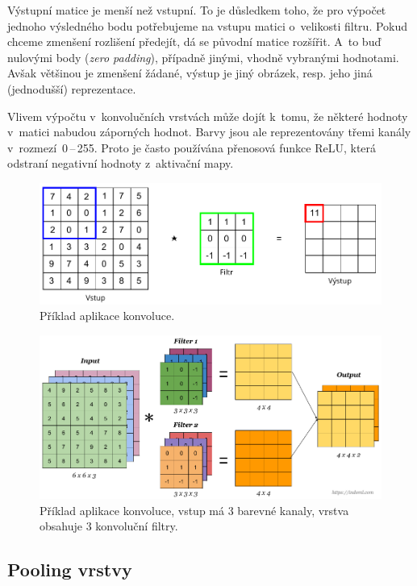 \begin{compactitem}
    \item Výstupní matice je menší než vstupní. To je důsledkem toho, že pro výpočet jednoho výsledného bodu potřebujeme na vstupu matici o~velikosti filtru. Pokud chceme zmenšení rozlišení předejít, dá se původní matice rozšířit. A~to buď nulovými body (\textit{zero padding}), případně jinými, vhodně vybranými hodnotami. Avšak většinou je zmenšení žádané, výstup je jiný obrázek, resp. jeho jiná (jednodušší) reprezentace.

    \item Vlivem výpočtu v~konvolučních vrstvách může dojít k~tomu, že některé hodnoty v~matici nabudou záporných hodnot. Barvy jsou ale reprezentovány třemi kanály v~rozmezí~0\,--\,255. Proto je často používána přenosová funkce ReLU, která odstraní negativní hodnoty z~aktivační mapy.
\end{compactitem}

\begin{figure}[H]
    \centering
    \includegraphics[width=0.8\linewidth]{convolution.pdf}
    \caption{Příklad aplikace konvoluce.}
\end{figure}

\begin{figure}[H]
    \centering
    \includegraphics[width=1\linewidth]{conv.png}
    \caption{Příklad aplikace konvoluce, vstup má 3 barevné kanaly, vrstva obsahuje 3 konvoluční filtry.}
\end{figure}

\subsection{Pooling vrstvy}

